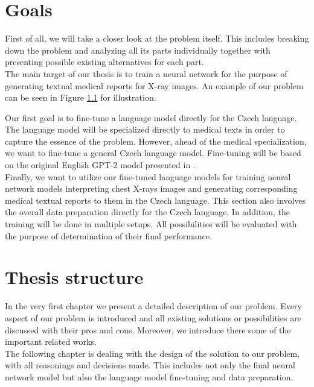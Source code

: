 \section*{Goals}
First of all, we will take a closer look at the problem itself. This includes breaking down the problem and analyzing all its parts individually together with presenting possible existing alternatives for each part. \\

The main target of our thesis is to train a neural network for the purpose of generating textual medical reports for X-ray images. An example of our problem can be seen in Figure \hyperref[fig01:ProblemExample]{1.1} for illustration.\\
\newpage

Our first goal is to fine-tune a language model directly for the Czech language. The language model will be specialized directly to medical texts in order to capture the essence of the problem. However, ahead of the medical specialization, we want to fine-tune a general Czech language model. Fine-tuning will be based on the original English GPT-2 model presented in \citet{radford2019language}.\\

Finally, we want to utilize our fine-tuned language models for training neural network models interpreting chest X-rays images and generating corresponding medical textual reports to them in the Czech language. This section also involves the overall data preparation directly for the Czech language. In addition, the training will be done in multiple setups. All possibilities will be evaluated with the purpose of determination of their final performance.\\

\section*{Thesis structure}

In the very first chapter we present a detailed description of our problem. Every aspect of our problem is introduced and all existing solutions or possibilities are discussed with their pros and cons. Moreover, we introduce there some of the important related works.\\

The following chapter is dealing with the design of the solution to our problem, with all reasonings and decisions made. This includes not only the final neural network model but also the language model fine-tuning and data preparation.\\

